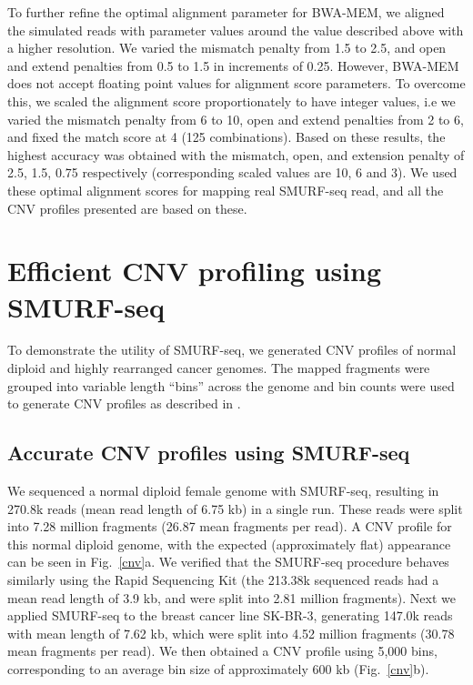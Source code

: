 To further refine the optimal alignment parameter for BWA-MEM, we
aligned the simulated reads with parameter values around the value
described above with a higher resolution. We varied the mismatch penalty
from 1.5 to 2.5, and open and extend penalties from 0.5 to 1.5 in
increments of 0.25.
%
However, BWA-MEM does not accept floating point values for alignment
score parameters. To overcome this, we scaled the alignment score
proportionately to have integer values, i.e we varied the mismatch
penalty from 6 to 10, open and extend penalties from 2 to 6, and fixed
the match score at 4 (125 combinations).
%
Based on these results, the highest accuracy was obtained with the
mismatch, open, and extension penalty of 2.5, 1.5, 0.75 respectively
(corresponding scaled values are 10, 6 and 3). We used these optimal
alignment scores for mapping real SMURF-seq read, and all the CNV
profiles presented are based on these.



\section{Efficient CNV profiling using SMURF-seq}
To demonstrate the utility of SMURF-seq, we generated CNV profiles of
normal diploid and highly rearranged cancer genomes.  The mapped
fragments were grouped into variable length ``bins'' across the genome
and bin counts were used to generate CNV profiles as described in
\cite{baslan2012genome,kendall2014computational}.

\subsection{Accurate CNV profiles using SMURF-seq}
We sequenced a normal diploid female genome with SMURF-seq, resulting in
270.8k reads (mean read length of 6.75 kb) in a single run. These reads
were split into 7.28 million fragments (26.87 mean fragments per read).
A CNV profile for this normal diploid genome, with the expected
(approximately flat) appearance can be seen in Fig.~\ref{cnv}a.  We
verified that the SMURF-seq procedure behaves similarly using the Rapid
Sequencing Kit (the 213.38k sequenced reads had a mean read length of
3.9 kb, and were split into 2.81 million fragments).  Next we applied
SMURF-seq to the breast cancer line SK-BR-3, generating 147.0k reads
with mean length of 7.62 kb, which were split into 4.52 million
fragments (30.78 mean fragments per read). We then obtained a CNV
profile using 5,000 bins, corresponding to an average bin size of
approximately 600 kb (Fig.~\ref{cnv}b).

